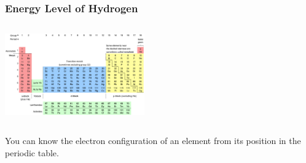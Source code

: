 \documentclass{beamer}
\begin{document}
\begin{frame}


\frametitle{Energy Level of Hydrogen}
        \begin{columns}
            \begin{column}{0.5\textwidth}
                \includegraphics[width=6cm]{../../../../public/images/pTable.png}
                
            \end{column}

            \begin{column}{0.5\textwidth}
    
            \end{column}
        \end{columns}
    
        \vspace{1cm}

    \onslide You can know the 
    \pause \alert{electron} 
    \onslide configuration of an element from its 
    \pause \alert{position} 
    \onslide in the periodic table. 
\end{frame}
\end{document}
